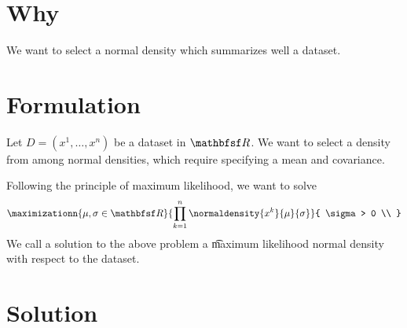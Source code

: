 

\section*{Why}

We want to select a normal density which summarizes well a dataset.

\section*{Formulation}

Let $D = (x^1, \dots , x^n)$ be a dataset in $\R $.
We want to select a density from among normal densities, which require specifying a mean and covariance.

Following the principle of maximum likelihood, we want to solve
    \[
\maximizationn{\mu ,\sigma  \in \R }{
\prod_{k = 1}^{n} \normaldensity{x^k}{\mu }{\sigma }
}{
\sigma  > 0 \\
}
    \]
We call a solution to the above problem a \t{maximum likelihood normal density} with respect to the dataset.

\section*{Solution}

